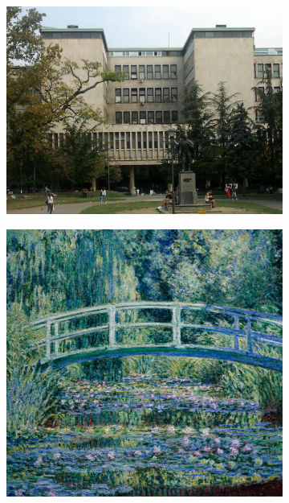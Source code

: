 \documentclass[a4paper,12pt]{article}
\begin{document}
\begin{figure}[H]
\centering
\begin{subfigure}{0.38\textwidth}
    \centering
    \includegraphics[width=\linewidth]{matf.jpg}
\end{subfigure}
\hfill
\begin{subfigure}{0.3\textwidth}
    \centering
    \includegraphics[width=\linewidth]{matf_monet.jpg}
\end{subfigure}



\end{figure}
\end{document}
